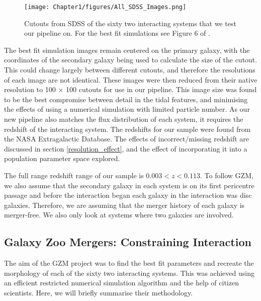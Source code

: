 \begin{figure}
    \centering
    \texttt{[image: Chapter1/figures/All\_SDSS\_Images.png]}
    \caption{Cutouts from SDSS of the sixty two interacting systems that we test our pipeline on. For the best fit simulations see Figure 6 of \citet{2016MNRAS.459..720H}.}
    \label{fig:Obj_Cutout}
\end{figure}

The best fit simulation images remain centered on the primary galaxy, with the coordinates of the secondary galaxy being used to calculate the size of the cutout. This could change largely between different cutouts, and therefore the resolutions of each image are not identical. These images were then reduced from their native resolution to 100 $\times$ 100 cutouts for use in our pipeline. This image size was found to be the best compromise between detail in the tidal features, and minimising the effects of using a numerical simulation with limited particle number. As our new pipeline also matches the flux distribution of each system, it requires the redshift of the interacting system. The redshifts for our sample were found from the NASA Extragalactic Database. The effects of incorrect/missing redshift are discussed in section \ref{resolution_effect}, and the effect of incorporating it into a population parameter space explored. 

The full range redshift range of our sample is $0.003 < z < 0.113$. To follow GZM, we also assume that the secondary galaxy in each system is on its first pericentre passage and before the interaction began each galaxy in the interaction was disc galaxies. Therefore, we are assuming that the merger history of each galaxy is merger-free. We also only look at systems where two galaxies are involved.

\subsection{Galaxy Zoo Mergers: Constraining Interaction}
The aim of the GZM project was to find the best fit parameters and recreate the morphology of each of the sixty two interacting systems. This was achieved using an efficient restricted numerical simulation algorithm and the help of citizen scientists. Here, we will briefly summarise their methodology.

